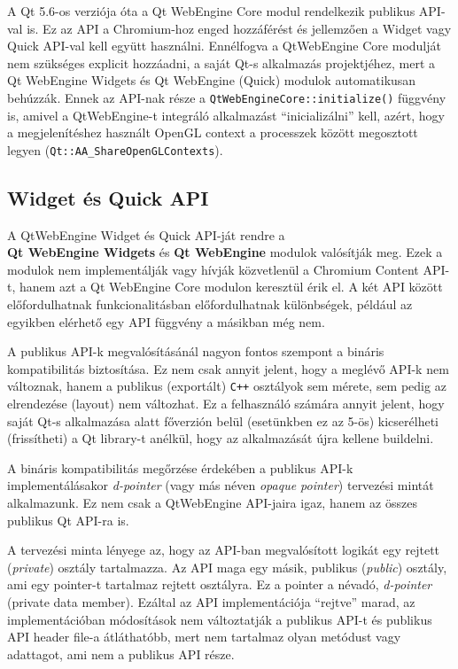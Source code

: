 \documentclass[12pt]{report}
\begin{document}
A Qt 5.6-os verziója óta a Qt WebEngine Core modul rendelkezik publikus API-val is.
Ez az API a Chromium-hoz enged hozzáférést és jellemzően a Widget vagy Quick API-val kell
együtt használni. Ennélfogva a QtWebEngine Core modulját nem szükséges explicit hozzáadni,
a saját Qt-s alkalmazás projektjéhez, mert a Qt WebEngine Widgets és Qt WebEngine (Quick)
modulok automatikusan behúzzák. Ennek az API-nak része a
\texttt{QtWebEngineCore::initialize()} függvény is, amivel a QtWebEngine-t integráló
alkalmazást ``inicializálni'' kell, azért, hogy a megjelenítéshez használt OpenGL context
a processzek között megosztott legyen (\texttt{Qt::AA\_ShareOpenGLContexts}).

\subsection{Widget és Quick API}
A QtWebEngine Widget és Quick API-ját rendre a \\
\textbf{Qt WebEngine Widgets} és \textbf{Qt WebEngine} modulok valósítják meg.
Ezek a modulok nem implementálják vagy hívják közvetlenül a Chromium Content API-t,
hanem azt a Qt WebEngine Core modulon keresztül érik el. A két API között előfordulhatnak
funkcionalitásban előfordulhatnak különbségek, például az egyikben elérhető egy API
függvény a másikban még nem.

A publikus API-k megvalósításánál nagyon fontos szempont a bináris kompatibilitás
biztosítása. Ez nem csak annyit jelent, hogy a meglévő API-k nem változnak, hanem a publikus
(exportált) \texttt{C++} osztályok sem mérete, sem pedig az elrendezése (layout) nem
változhat. Ez a felhasználó számára annyit jelent, hogy saját Qt-s alkalmazása alatt
főverzión belül (esetünkben ez az 5-ös) kicserélheti (frissítheti) a Qt library-t anélkül,
hogy az alkalmazását újra kellene buildelni.

A bináris kompatibilitás megőrzése érdekében a publikus API-k implementálásakor
\textit{d-pointer} (vagy más néven \textit{opaque pointer}) tervezési mintát alkalmazunk.
Ez nem csak a QtWebEngine API-jaira igaz, hanem az összes publikus Qt API-ra is.

A tervezési minta lényege az, hogy az API-ban megvalósított logikát egy rejtett
(\textit{private}) osztály tartalmazza. Az API maga egy másik, publikus (\textit{public})
osztály, ami egy pointer-t tartalmaz rejtett osztályra. Ez a pointer a névadó,
\textit{d-pointer} (private data member). Ezáltal az API implementációja ``rejtve'' marad,
az implementációban módosítások nem változtatják a publikus API-t és publikus API header
file-a átláthatóbb, mert nem tartalmaz olyan metódust vagy adattagot, ami nem a publikus
API része.
\cite{bib:qt-wiki-d-pointer}
\end{document}
